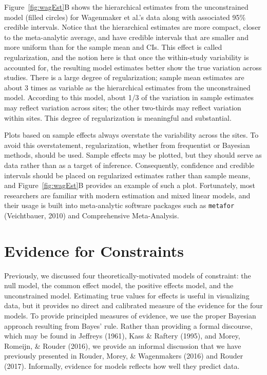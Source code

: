 \documentclass[english,man]{apa6}
\theoremstyle{definition}
\theoremstyle{definition}
\theoremstyle{remark}
\begin{document}
Figure~\ref{fig:wagEst}B shows the hierarchical estimates from the
unconstrained model (filled circles) for Wagenmaker et al.'s data along
with associated 95\% credible intervals. Notice that the hierarchical
estimates are more compact, closer to the meta-analytic average, and
have credible intervals that are smaller and more uniform than for the
sample mean and CIs. This effect is called regularization, and the
notion here is that once the within-study variability is accounted for,
the resulting model estimates better show the true variation across
studies. There is a large degree of regularization; sample mean
estimates are about 3 times as variable as the hierarchical estimates
from the unconstrained model. According to this model, about 1/3 of the
variation in sample estimates may reflect variation across sites; the
other two-thirds may reflect variation within sites. This degree of
regularization is meaningful and substantial.

Plots based on sample effects always overstate the variability across
the sites. To avoid this overstatement, regularization, whether from
frequentist or Bayesian methods, should be used. Sample effects may be
plotted, but they should serve as data rather than as a target of
inference. Consequently, confidence and credible intervals should be
placed on regularized estimates rather than sample means, and
Figure~\ref{fig:wagEst}B provides an example of such a plot.
Fortunately, most researchers are familiar with modern estimation and
mixed linear models, and their usage is built into meta-analytic
software packages such as \texttt{metafor} (Veichtbauer, 2010) and
Comprehensive Meta-Analysis.

\section{Evidence for Constraints}\label{evidence-for-constraints}

Previously, we discussed four theoretically-motivated models of
constraint: the null model, the common effect model, the positive
effects model, and the unconstrained model. Estimating true values for
effects is useful in visualizing data, but it provides no direct and
calibrated measure of the evidence for the four models. To provide
principled measures of evidence, we use the proper Bayesian approach
resulting from Bayes' rule. Rather than providing a formal discourse,
which may be found in Jeffreys (1961), Kass \& Raftery (1995), and
Morey, Romeijn, \& Rouder (2016), we provide an informal discussion that
we have previously presented in Rouder, Morey, \& Wagenmakers (2016) and
Rouder (2017). Informally, evidence for models reflects how well they
predict data.
\end{document}
